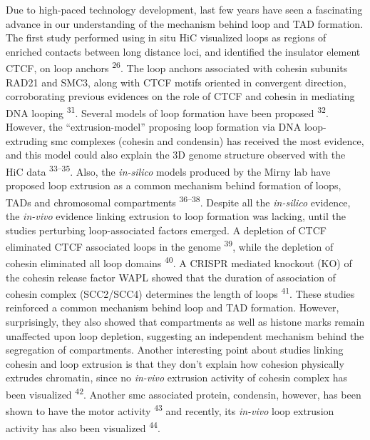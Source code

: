 \documentclass[11pt,twoside]{MPIthesis}
\theoremstyle{definition}
\theoremstyle{definition}
\theoremstyle{definition}
\theoremstyle{remark}
\begin{document}
Due to high-paced technology development, last few years have seen a
fascinating advance in our understanding of the mechanism behind loop
and TAD formation. The first study performed using in situ HiC
visualized loops as regions of enriched contacts between long distance
loci, and identified the insulator element CTCF, on loop anchors
\textsuperscript{26}. The loop anchors associated with cohesin subunits
RAD21 and SMC3, along with CTCF motifs oriented in convergent direction,
corroborating previous evidences on the role of CTCF and cohesin in
mediating DNA looping \textsuperscript{31}. Several models of loop
formation have been proposed \textsuperscript{32}. However, the
``extrusion-model'' proposing loop formation via DNA loop-extruding smc
complexes (cohesin and condensin) has received the most evidence, and
this model could also explain the 3D genome structure observed with the
HiC data \textsuperscript{33--35}. Also, the \emph{in-silico} models
produced by the Mirny lab have proposed loop extrusion as a common
mechanism behind formation of loops, TADs and chromosomal compartments
\textsuperscript{36--38}. Despite all the \emph{in-silico} evidence, the
\emph{in-vivo} evidence linking extrusion to loop formation was lacking,
until the studies perturbing loop-associated factors emerged. A
depletion of CTCF eliminated CTCF associated loops in the genome
\textsuperscript{39}, while the depletion of cohesin eliminated all loop
domains \textsuperscript{40}. A CRISPR mediated knockout (KO) of the
cohesin release factor WAPL showed that the duration of association of
cohesin complex (SCC2/SCC4) determines the length of loops
\textsuperscript{41}. These studies reinforced a common mechanism behind
loop and TAD formation. However, surprisingly, they also showed that
compartments as well as histone marks remain unaffected upon loop
depletion, suggesting an independent mechanism behind the segregation of
compartments. Another interesting point about studies linking cohesin
and loop extrusion is that they don't explain how cohesion physically
extrudes chromatin, since no \emph{in-vivo} extrusion activity of
cohesin complex has been visualized \textsuperscript{42}. Another smc
associated protein, condensin, however, has been shown to have the motor
activity \textsuperscript{43} and recently, its \emph{in-vivo} loop
extrusion activity has also been visualized \textsuperscript{44}.
\end{document}
